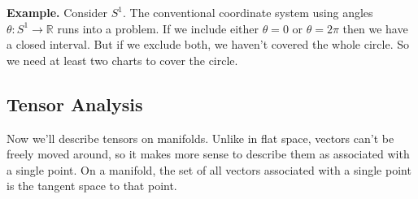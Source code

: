\documentclass[11pt]{article}
\begin{document}
\noindent \textbf{Example.} Consider \( S^{1} \). The conventional coordinate system using angles \( \theta \colon S^{1} \rightarrow \mathbb{R} \) runs into a problem. If we include either \( \theta = 0 \) or \( \theta = 2\pi\) then we have a closed interval. But if we exclude both,
we haven't covered the whole circle. So we need at least two charts to cover the circle.
\\

\subsection{Tensor Analysis}
\noindent Now we'll describe tensors on manifolds. Unlike in flat space, vectors can't be freely moved around, so it makes more sense to describe them as associated with a single point. On a manifold, the set of all vectors associated with a single point is the tangent space to that point. 
\end{document}
